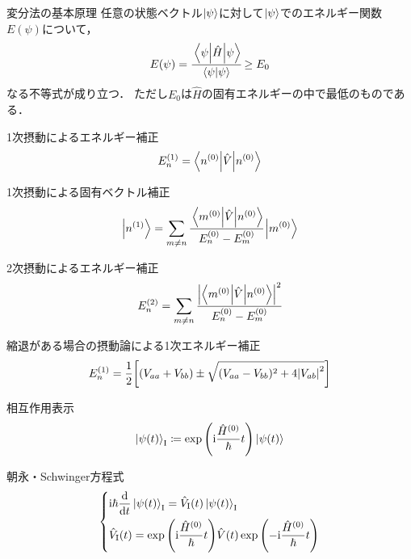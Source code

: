 \documentclass{report}
\begin{document}
  \begin{itembox}[l]{変分法の基本原理}
  任意の状態ベクトル$\ket{\psi}$に対して$\ket{\psi}$でのエネルギー関数$E(\psi)$について，
    \begin{align*}
      E(\psi) = \cfrac{\mel**{\psi}{\hat{H}}{\psi}}{\braket{\psi}} \geq E_0 \label{minimum}
    \end{align*}
  なる不等式が成り立つ．
  ただし$E_0$は$\hat{H}$の固有エネルギーの中で最低のものである．
  \end{itembox}
  \begin{itembox}[l]{1次摂動によるエネルギー補正}
    \begin{align*}
      E_n^{(1)} = \ev**{\hat{V}}{n^{(0)}}
    \end{align*}
  \end{itembox}
  \begin{itembox}[l]{1次摂動による固有ベクトル補正}
    \begin{align*}
      \ket{n^{(1)}} = \sum_{m\neq n}\cfrac{\mel**{m^{(0)}}{\hat{V}}{n^{(0)}}}{E_n^{(0)} - E_m^{(0)}}\ket{m^{(0)}}
    \end{align*}
  \end{itembox}
  \begin{itembox}[l]{2次摂動によるエネルギー補正}
    \begin{align*}
      E_n^{(2)} = \sum_{m\neq n}\cfrac{\abs{\mel**{m^{(0)}}{\hat{V}}{n^{(0)}}}^2}{E_n^{(0)} - E_m^{(0)}}
    \end{align*}
  \end{itembox}
  \begin{itembox}[l]{縮退がある場合の摂動論による1次エネルギー補正}
    \begin{align*}
      E_n^{(1)} = \frac{1}{2}\qty[(V_{aa} + V_{bb}) \pm \sqrt{(V_{aa} - V_{bb})^2 + 4\abs{V_{ab}}^2}]
    \end{align*}
  \end{itembox}
  \begin{itembox}[l]{相互作用表示}
    \begin{align*}
      \ket{\psi(t)}_{\mathrm{I}} \coloneqq \exp\qty(\mathrm{i}\frac{\hat{H}^{(0)}}{\hbar}t)\ket{\psi(t)}
    \end{align*}
  \end{itembox}
  \begin{itembox}[l]{朝永・Schwinger方程式}
    \begin{align*}
      \begin{dcases}
        \mathrm{i}\hbar\dv{t}\ket{\psi(t)}_{\mathrm{I}} = \hat{V}_{\mathrm{I}}(t)\ket{\psi(t)}_{\mathrm{I}} \\
        \hat{V}_{\mathrm{I}}(t) = \exp\qty(\mathrm{i}\frac{\hat{H}^{(0)}}{\hbar}t)\hat{V}(t)\exp\qty(-\mathrm{i}\frac{\hat{H}^{(0)}}{\hbar}t)
      \end{dcases}
    \end{align*}
  \end{itembox}
\end{document}
